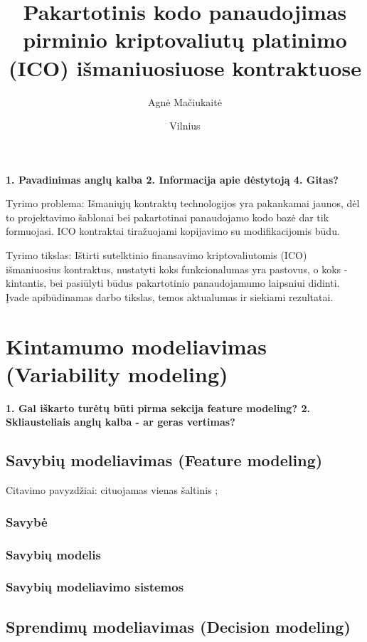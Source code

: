 \documentclass{VUMIFInfKursinis}
\title{Pakartotinis kodo panaudojimas pirminio kriptovaliutų platinimo (ICO) išmaniuosiuose kontraktuose}
\author{Agnė Mačiukaitė}
\date{Vilnius \\ \the\year}
\begin{document}
\maketitle

\tableofcontents

%
\textbf{1. Pavadinimas anglų kalba
2. Informacija apie dėstytoją
4. Gitas?}

Tyrimo problema: Išmaniųjų kontraktų technologijos yra pakankamai jaunos, dėl to projektavimo šablonai bei pakartotinai panaudojamo kodo bazė dar tik formuojasi. ICO kontraktai tiražuojami kopijavimo su modifikacijomis būdu.

Tyrimo tikslas: Ištirti sutelktinio finansavimo kriptovaliutomis (ICO) išmaniuosius kontraktus, nustatyti koks funkcionalumas yra pastovus, o koks - kintantis, bei pasiūlyti būdus pakartotinio panaudojamumo laipsniui didinti.
Įvade apibūdinamas darbo tikslas, temos aktualumas ir siekiami rezultatai.

\section{Kintamumo modeliavimas (Variability modeling)}
\textbf{1. Gal iškarto turėtų būti pirma sekcija feature modeling?
2. Skliausteliais anglų kalba - ar geras vertimas?}

\subsection{Savybių modeliavimas (Feature modeling)}
Citavimo pavyzdžiai: cituojamas vienas šaltinis \cite{Berger2010};
\subsubsection{Savybė}
\subsubsection{Savybių modelis}
\subsubsection{Savybių modeliavimo sistemos}
\subsection{Sprendimų modeliavimas (Decision modeling)}
\end{document}
